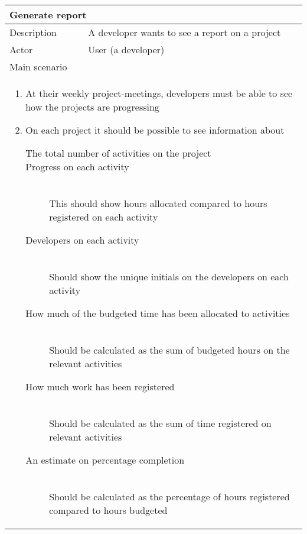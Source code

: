 \begin{table}[H]
  \begin{tabular}{|l|l|}
    \multicolumn{2}{l}{
      \bf{Generate report}
    }
    \\ \hline
    Description & A developer wants to see a report on a project
    \\ \hline
    Actor & User (a developer)
    \\ \hline \multicolumn{2}{|l|}{
      Main scenario 
    }
    \\ \hline \multicolumn{2}{|l|}{ \parbox{\textwidth}{
        \begin{enumerate}        
        \item{At their weekly project-meetings, developers must be able to see how the projects are progressing}
        \item{On each project it should be possible to see information about}
          \begin{description}
          \item[The total number of activities on the project] {}

          \item[Progress on each activity] \hfill \\
            {This should show hours allocated compared to hours registered on each activity}
			
			\item[Developers on each activity]\hfill \\
            {Should show the unique initials on the developers on each activity}

          \item[How much of the budgeted time has been allocated to activities]\hfill \\
            {Should be calculated as the sum of budgeted hours on the relevant activities}

          \item[How much work has been registered]\hfill \\
            {Should be calculated as the sum of time registered on relevant activities}

          \item[An estimate on percentage completion]\hfill \\
            {Should be calculated as the percentage of hours registered compared to hours budgeted}


\end{description}
\end{enumerate}}}
\end{tabular}
\end{table}
